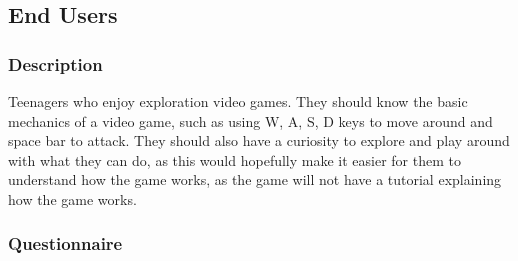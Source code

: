 \documentclass[../Main.tex]{subfiles}
\begin{document}
    \subsection{End Users}
        \subsubsection{\textbf{Description}}
            Teenagers who enjoy exploration video games. They should know the basic mechanics of a video game, such as using W, A, S, D keys to move around and space bar to attack. They should also have a curiosity to explore and play around with what they can do, as this would hopefully make it easier for them to understand how the game works, as the game will not have a tutorial explaining how the game works.
        \subsubsection{Questionnaire}
\end{document}
